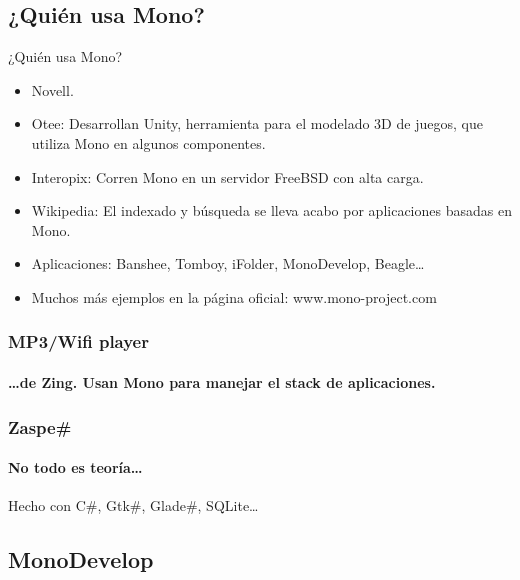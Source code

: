 \documentclass{beamer}
\begin{document}
\subsection{¿Quién usa Mono?}

\begin{frame}{¿Quién usa Mono?}
  \begin{itemize}
    \item Novell.
    \item Otee: Desarrollan Unity, herramienta para el modelado 3D de juegos, que
      utiliza Mono en algunos componentes.
    \item Interopix: Corren Mono en un servidor FreeBSD con alta carga.
    \item Wikipedia: El indexado y búsqueda se lleva acabo por aplicaciones basadas en Mono.
    \item Aplicaciones: Banshee, Tomboy, iFolder, MonoDevelop, Beagle\ldots
    \item Muchos más ejemplos en la página oficial: \alert{www.mono-project.com}
  \end{itemize}
\end{frame}

\begin{frame}[plain]
  \frametitle{MP3/Wifi player}
  \framesubtitle{\ldots de Zing. Usan Mono para manejar el stack de aplicaciones.}

  \begin{centering}
  \end{centering}
\end{frame}

\begin{frame}
  \frametitle{Zaspe\#}
  \framesubtitle{No todo es teoría\ldots}

  \begin{centering}
  \end{centering}

  Hecho con C\#, Gtk\#, Glade\#, SQLite\ldots
\end{frame}


\subsection{MonoDevelop}
\end{document}
